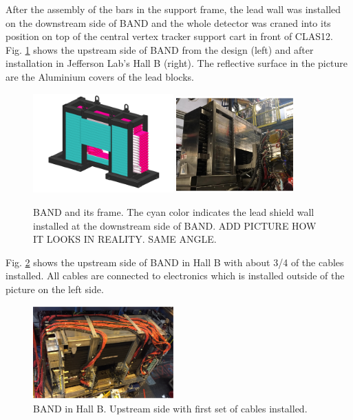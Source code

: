 \documentclass[3p,final,twocolumn]{elsarticle}
\begin{document}
After the assembly of the bars in the support frame, the lead wall was installed on the downstream side of BAND and the whole detector was craned into its position on top of the central vertex tracker support cart in front of CLAS12. Fig. \ref{fig:band_downstream} shows the upstream side of BAND from the design (left) and after installation in Jefferson Lab's Hall B (right). The reflective surface in the picture are the Aluminium covers of the lead blocks. 
\begin{figure}[th]
	\centering
	\includegraphics[width=0.48\textwidth]{BAND_1-2.png} 
	\includegraphics[width=0.40\textwidth]{pic-bandinhall1.pdf}
		\caption{BAND and its frame. The cyan color indicates the lead shield wall installed at the downstream side of BAND. ADD PICTURE HOW IT LOOKS IN REALITY. SAME ANGLE.}
		\label{fig:band_downstream}
\end{figure}

Fig. \ref{fig:bandinhall} shows the upstream side of BAND in Hall B with about 3/4 of the cables installed. All cables are connected to electronics which is installed outside of the picture on the left side.
\begin{figure}[tb]
	\centering
	\includegraphics[width=0.48\textwidth]{pic-bandinhall2.pdf}
				\caption{BAND in Hall B. Upstream side with first set of cables installed.}
		\label{fig:bandinhall}
\end{figure}
\end{document}
